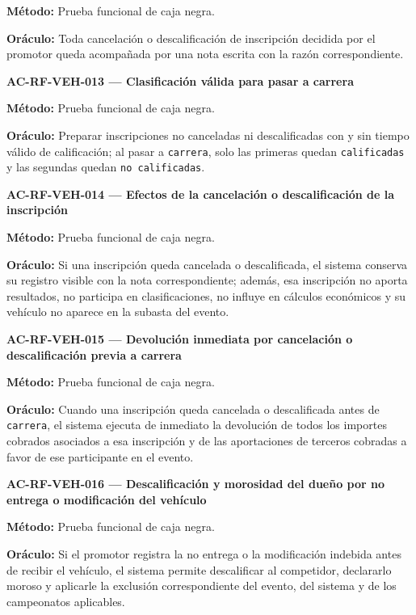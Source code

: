 \documentclass[10pt,letterpaper]{article}
\begin{document}
\textbf{Método:} Prueba funcional de caja negra.\par
\textbf{Oráculo:} Toda cancelación o descalificación de inscripción decidida por el promotor queda acompañada por una nota escrita con la razón correspondiente.\par\vspace{0.45em}
\noindent\textbf{AC-RF-VEH-013 --- Clasificación válida para pasar a carrera}\par
\textbf{Método:} Prueba funcional de caja negra.\par
\textbf{Oráculo:} Preparar inscripciones no canceladas ni descalificadas con y sin tiempo válido de calificación; al pasar a \texttt{carrera}, solo las primeras quedan \texttt{calificadas} y las segundas quedan \texttt{no calificadas}.\par\vspace{0.45em}
\noindent\textbf{AC-RF-VEH-014 --- Efectos de la cancelación o descalificación de la inscripción}\par
\textbf{Método:} Prueba funcional de caja negra.\par
\textbf{Oráculo:} Si una inscripción queda cancelada o descalificada, el sistema conserva su registro visible con la nota correspondiente; además, esa inscripción no aporta resultados, no participa en clasificaciones, no influye en cálculos económicos y su vehículo no aparece en la subasta del evento.\par\vspace{0.45em}
\noindent\textbf{AC-RF-VEH-015 --- Devolución inmediata por cancelación o descalificación previa a carrera}\par
\textbf{Método:} Prueba funcional de caja negra.\par
\textbf{Oráculo:} Cuando una inscripción queda cancelada o descalificada antes de \texttt{carrera}, el sistema ejecuta de inmediato la devolución de todos los importes cobrados asociados a esa inscripción y de las aportaciones de terceros cobradas a favor de ese participante en el evento.\par\vspace{0.45em}
\noindent\textbf{AC-RF-VEH-016 --- Descalificación y morosidad del dueño por no entrega o modificación del vehículo}\par
\textbf{Método:} Prueba funcional de caja negra.\par
\textbf{Oráculo:} Si el promotor registra la no entrega o la modificación indebida antes de recibir el vehículo, el sistema permite descalificar al competidor, declararlo moroso y aplicarle la exclusión correspondiente del evento, del sistema y de los campeonatos aplicables.\par\vspace{0.45em}
\end{document}
